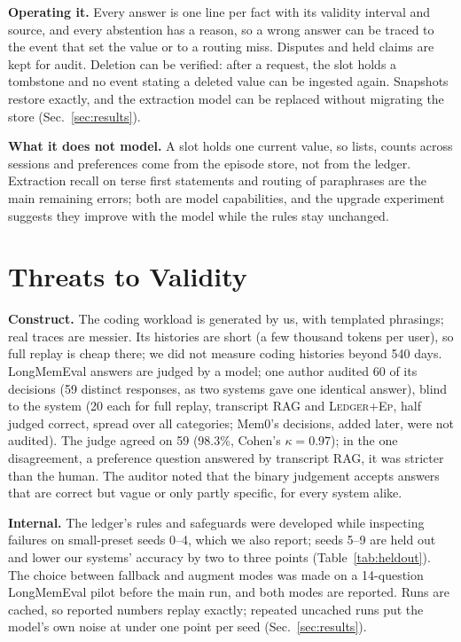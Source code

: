 \documentclass[10pt,conference]{IEEEtran}
\newcommand{\hyb}{\textsc{Ledger+Ep}}
\begin{document}
\textbf{Operating it.} Every answer is one line per fact with its validity
interval and source, and every abstention has a reason, so a wrong answer can
be traced to the event that set the value or to a routing miss. Disputes and
held claims are kept for audit. Deletion can be verified: after a request, the
slot holds a tombstone and no event stating a deleted value can be ingested
again. Snapshots restore exactly, and the extraction model can be replaced
without migrating the store (Sec.~\ref{sec:results}).

\textbf{What it does not model.} A slot holds one current value, so lists,
counts across sessions and preferences come from the episode store, not from
the ledger. Extraction recall on terse first statements and routing of
paraphrases are the main remaining errors; both are model capabilities, and
the upgrade experiment suggests they improve with the model while the rules
stay unchanged.

\section{Threats to Validity}
\label{sec:threats}

\textbf{Construct.} The coding workload is generated by us, with templated
phrasings; real traces are messier. Its histories are short (a few thousand
tokens per user), so full replay is cheap there; we did not measure coding
histories beyond 540 days. LongMemEval answers are judged by a model; one
author audited 60 of its decisions (59 distinct responses, as two systems gave
one identical answer), blind to the system (20 each for full replay,
transcript RAG and \hyb{}, half judged correct, spread over all categories;
Mem0's decisions, added later, were not audited).
The judge agreed on 59 (98.3\%, Cohen's $\kappa=0.97$); in the one
disagreement, a preference question answered by transcript RAG, it was
stricter than the human. The auditor noted that the binary judgement accepts
answers that are correct but vague or only partly specific, for every system
alike.

\textbf{Internal.} The ledger's rules and safeguards were developed while
inspecting failures on small-preset seeds 0--4, which we also report; seeds
5--9 are held out and lower our systems' accuracy by two to three points
(Table~\ref{tab:heldout}). The
choice between fallback and augment modes was made on a 14-question
LongMemEval pilot before the main run, and both modes are reported. Runs are
cached, so reported numbers replay exactly; repeated uncached runs put the
model's own noise at under one point per seed (Sec.~\ref{sec:results}).
\end{document}
